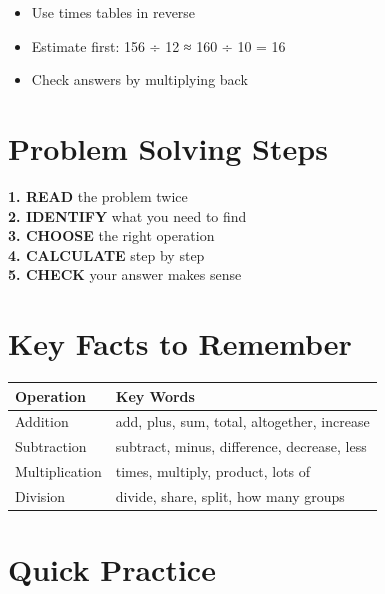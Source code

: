 \documentclass[a4paper,11pt]{article}
\begin{document}
\begin{tcolorbox}[colback=red!5!white,colframe=red!75!black,title=\textbf{Division Tips}]
\begin{itemize}
    \item Use times tables in reverse
    \item Estimate first: 156 ÷ 12 ≈ 160 ÷ 10 = 16
    \item Check answers by multiplying back
\end{itemize}
\end{tcolorbox}

\section{Problem Solving Steps}

\begin{tcolorbox}[colback=purple!5!white,colframe=purple!75!black,title=\textbf{Word Problem Strategy}]
\textbf{1. READ} the problem twice
\\
\textbf{2. IDENTIFY} what you need to find
\\
\textbf{3. CHOOSE} the right operation
\\
\textbf{4. CALCULATE} step by step
\\
\textbf{5. CHECK} your answer makes sense
\end{tcolorbox}

\section{Key Facts to Remember}

\begin{center}
\begin{tabular}{|l|l|}
\hline
\textbf{Operation} & \textbf{Key Words} \\
\hline
Addition & add, plus, sum, total, altogether, increase \\
\hline
Subtraction & subtract, minus, difference, decrease, less \\
\hline
Multiplication & times, multiply, product, lots of \\
\hline
Division & divide, share, split, how many groups \\
\hline
\end{tabular}
\end{center}

\section{Quick Practice}
\end{document}
